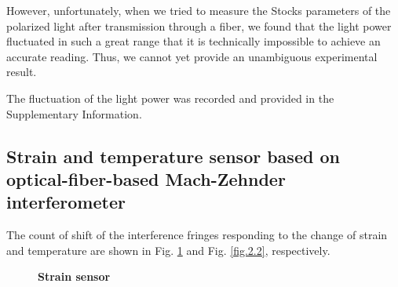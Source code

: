 \documentclass[10pt,a4paper,twocolumn,twoside,UTF8]{article}
\begin{document}
	However, unfortunately, when we tried to measure the Stocks parameters of the polarized light after transmission through a fiber, 
	we found that the light power fluctuated in such a great range that it is technically impossible to achieve an accurate reading.
	Thus, we cannot yet provide an unambiguous experimental result.

	The fluctuation of the light power was recorded and provided in the Supplementary Information.

	\subsection{Strain and temperature sensor based on optical-fiber-based Mach-Zehnder interferometer}
	The count of shift of the interference fringes responding to the change of strain and temperature are shown in Fig. \ref{fig.2.1} and Fig. \ref{fig.2.2}, respectively.
	
		\begin{figure}[htbp]
		\centering

		\caption{\textbf{Strain sensor}}
		\label{fig.2.1}
	\end{figure}
\end{document}
